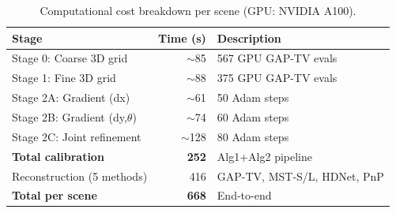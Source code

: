 \begin{table}[t]
\centering
\caption{Computational cost breakdown per scene (GPU: NVIDIA A100).}
\label{tab:cost}
\small
\begin{tabular}{l r l}
\toprule
Stage & Time (s) & Description \\
\midrule
Stage 0: Coarse 3D grid & $\sim$85 & 567 GPU GAP-TV evals \\
Stage 1: Fine 3D grid & $\sim$88 & 375 GPU GAP-TV evals \\
Stage 2A: Gradient (dx) & $\sim$61 & 50 Adam steps \\
Stage 2B: Gradient (dy,$\theta$) & $\sim$74 & 60 Adam steps \\
Stage 2C: Joint refinement & $\sim$128 & 80 Adam steps \\
\midrule
\textbf{Total calibration} & \textbf{252} & Alg1+Alg2 pipeline \\
Reconstruction (5 methods) & 416 & GAP-TV, MST-S/L, HDNet, PnP \\
\midrule
\textbf{Total per scene} & \textbf{668} & End-to-end \\
\bottomrule
\end{tabular}
\end{table}